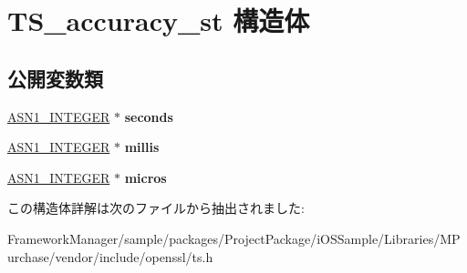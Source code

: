 \hypertarget{struct_t_s__accuracy__st}{}\section{T\+S\+\_\+accuracy\+\_\+st 構造体}
\label{struct_t_s__accuracy__st}
\subsection*{公開変数類}
\begin{DoxyCompactItemize}
\item 
\hypertarget{struct_t_s__accuracy__st_a50d21da03ece4bf6c78f3fa96ffaae15}{}\hyperlink{structasn1__string__st}{A\+S\+N1\+\_\+\+I\+N\+T\+E\+G\+E\+R} $\ast$ {\bfseries seconds}\label{struct_t_s__accuracy__st_a50d21da03ece4bf6c78f3fa96ffaae15}

\item 
\hypertarget{struct_t_s__accuracy__st_a617d05085e9ab508437929ab86b6f4a3}{}\hyperlink{structasn1__string__st}{A\+S\+N1\+\_\+\+I\+N\+T\+E\+G\+E\+R} $\ast$ {\bfseries millis}\label{struct_t_s__accuracy__st_a617d05085e9ab508437929ab86b6f4a3}

\item 
\hypertarget{struct_t_s__accuracy__st_af1acda98f117fef39f799581bf37bb38}{}\hyperlink{structasn1__string__st}{A\+S\+N1\+\_\+\+I\+N\+T\+E\+G\+E\+R} $\ast$ {\bfseries micros}\label{struct_t_s__accuracy__st_af1acda98f117fef39f799581bf37bb38}

\end{DoxyCompactItemize}


この構造体詳解は次のファイルから抽出されました\+:\begin{DoxyCompactItemize}
\item 
Framework\+Manager/sample/packages/\+Project\+Package/i\+O\+S\+Sample/\+Libraries/\+M\+Purchase/vendor/include/openssl/ts.\+h\end{DoxyCompactItemize}
